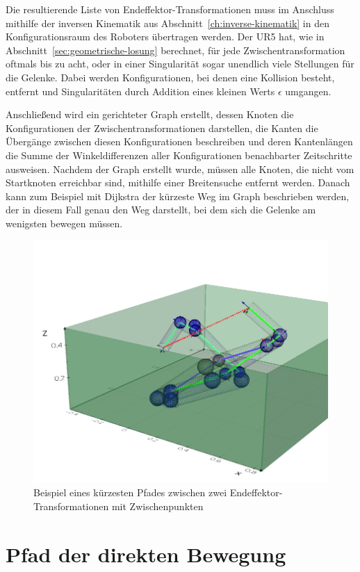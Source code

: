 Die resultierende Liste von Endeffektor-Transformationen muss im Anschluss mithilfe der inversen Kinematik aus Abschnitt~\ref{ch:inverse-kinematik} in den Konfigurationsraum des Roboters übertragen werden.
Der UR5 hat, wie in Abschnitt~\ref{sec:geometrische-losung} berechnet, für jede Zwischentransformation oftmals bis zu acht, oder in einer Singularität sogar unendlich viele Stellungen für die Gelenke.
Dabei werden Konfigurationen, bei denen eine Kollision besteht, entfernt und Singularitäten durch Addition eines kleinen Werts $\epsilon$ umgangen.

Anschließend wird ein gerichteter Graph erstellt, dessen Knoten die Konfigurationen der Zwischentransformationen darstellen, die Kanten die Übergänge zwischen diesen Konfigurationen beschreiben und deren Kantenlängen die Summe der Winkeldifferenzen aller Konfigurationen benachbarter Zeitschritte ausweisen.
Nachdem der Graph erstellt wurde, müssen alle Knoten, die nicht vom Startknoten erreichbar sind, mithilfe einer Breitensuche entfernt werden.
Danach kann zum Beispiel mit Dijkstra der kürzeste Weg im Graph beschrieben werden, der in diesem Fall genau den Weg darstellt, bei dem sich die Gelenke am wenigsten bewegen müssen.

\begin{figure}[h]
    \centering
    \includegraphics[width = .8\textwidth]{Bilder/shortestpath}
    \caption{Beispiel eines kürzesten Pfades zwischen zwei Endeffektor-Trans\-for\-ma\-tio\-nen mit Zwischenpunkten}\label{fig:pth1}
\end{figure}


\section{Pfad der direkten Bewegung}\label{sec:direkterweg}

